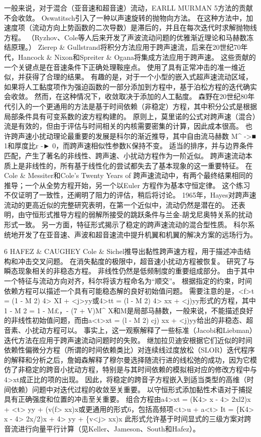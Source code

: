 \documentclass[UTF8,11pt,a4paper,openany,fontset=fandol]{ctexbook}
\begin{document}
一般来说，对于混合（亚音速和超音速）流动，EARLL MURMAN 5方法的贡献不会收敛。 Oswatitsch引入了一种以声速旋转的抛物向方法。 在这种方法中，加速度项（流动方向上势函数的二次导数）是滞后的，并且在每次迭代时求解抛物线方程。 （Ryzhov、Cole等人后来开发了声波流动问题的优雅渐近理论和马赫数冻结原理。） Zierep \& Gullstrand将积分方法应用于跨声速流，后来在20世纪70年代，Hancock \& Nixon和Spreiter \& Ogana将集成方法应用于跨声速。 这些贡献的一个关键点是在音速条件下正确处理鞍座点。 使用了具有正常冲击的准一维近似，并获得了合理的结果。 有趣的是，对于一个小型的嵌入式超声速流动区域，如果将人工黏度项作为强迫函数的一部分添加到方程中，基于泊松方程的迭代确实会收敛。 然而，在这种情况下，收敛取决于添加的人工黏度。 森野在20世纪80年代引入的一个更通用的方法是基于时间依赖（非稳定）方程，其中积分公式是根据局部条件具有可变系数的波方程构建的。 原则上，莫里诺的公式对跨声速（混合）流是有效的，但由于评估与时间相关的内核需要密集的计算，因此成本很高。 也许跨声速小扰动理论最重要的发展是科尔的渐近推导，其中自由流马赫数 M\textasciicircum{} ->■ 1和厚度比r -► 0，而跨声速相似性参数K保持不变。 适当的排序，并与边界条件匹配，产生了著名的非线性、跨声速、小扰动方程作为一阶近似。 跨声速流动本质上是非线性的，所有基于线性化的尝试都失去了基本现象的这一重要特征。 在Cole \& Messiter和Cole's Twenty Years of 跨声速流动中，有两个最终结果相同的推导；一个从全势方程开始，另一个以Euler 方程作为基本守恒定律。 这个练习不仅证明了一致性，还阐明了阻力的评估，稍后将讨论。 1965年，Hayes对跨声速流动的更高近似的完整研究表明，在第一个近似中，流动仍然是潜在的。 还表明，由守恒形式推导方程的弱解所接受的跳跃条件与兰金-胡戈尼奥特关系的扰动形式一致。 另一方面，特征形式揭示了稳定的跨声速流动的混合型性质。 科尔系统地开发了在亚音速、声波和超音速流中提升机翼和机翼的解决方案的远场行为。

6 HAFEZ \& CAUGHEY Cole \& Sichel推导出黏性跨声速方程，用于描述冲击结构和冲击交叉问题。 在消失黏度的极限中，超音速小扰动方程被恢复。 研究了与瞬态现象相关的非稳态方程。 非线性仍然是低频制度的重要组成部分。 由于其中一个特征与流动方向对齐，科尔将该方程命名为“顺交”。 根据指定的约束，时间依赖方程可以描述一个具有可能稳态解的良好初始值问题。 需要注意的是，<f>t = (1 - M 2) 4> XI + <j>yy或4>tt = (l - M 2) 4> xx + <j)yy形式的方程，其中1 - M 2 = 1 - M£，- (7 + V)M\textasciicircum{} X和M是局部马赫数，一般来说，不能描述良好的非线性初始值问题，而由a<t>xt = (l - M 2) cj) xx + <j)yy给出的非稳态、超音素、小扰动方程可以。 事实上，这一观察解释了一些标准（Jacobi和Liebman）迭代方法在应用于跨声速流动问题时的失败。 继加拉贝迪安根据它们近似的时间依赖性偏微分方程（所谓的时间依赖类比）对连续线过度放松（SLOR）迭代程序的解释和分析之后，詹姆森解释了穆尔曼选择随流行进的线松弛的成功，因为它模仿了非稳定的跨音小扰动方程，特别是与其时间依赖的模拟相对应的修改方程中与4>xt成正比的项的出现。 因此，将稳定的跨音子方程嵌入到适当类型的高维（时间依赖）问题中对迭代过程的收敛至关重要。 以守恒形式添加黏性术语对于捕捉具有正确强度和位置的冲击至关重要。 组合方程由a4>xt = (K4> x - 4> 2xl2)x + <t> yy + (v(f> xx)x或更通用的形式6，包括高频项<t>u + a<t> It = \{K4> x - 4> 2x/2)x + 4> yy + \{v<j> xx)x 此形式允许基于时间显式的三级方案对跨音流进行向量平行计算（见Keller、Jameson、South和Hafez）。
\end{document}
